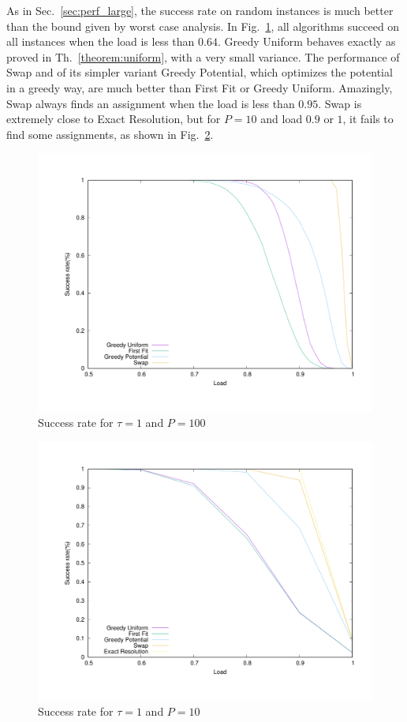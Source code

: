 \documentclass[a4paper,UKenglish,cleveref, autoref, thm-restate]{lipics-v2019}
\begin{document}
As in Sec.~\ref{sec:perf_large}, the success rate on random instances is much better than the bound given by worst case analysis. In Fig.~\ref{fig:tau1}, all algorithms succeed on all instances when the load is less than $0.64$. Greedy Uniform behaves exactly as proved in Th.~\ref{theorem:uniform}, with a very small variance. The performance of Swap and of its simpler variant Greedy Potential, which optimizes the potential in a greedy way, are much better than First Fit or Greedy Uniform. Amazingly, Swap always finds an assignment when the load is less than $0.95$. Swap is extremely close to Exact Resolution, but for $P=10$ and load $0.9$ or $1$, it fails to find some assignments, as shown in Fig.~\ref{fig:tau1-10mess}.

\begin{figure}
\begin{center}
\includegraphics[scale=0.3]{success_tau1}
\end{center}
\caption{Success rate for $\tau = 1$ and $P=100$}
\label{fig:tau1}
\end{figure}

\begin{figure}
\begin{center}
\includegraphics[scale=0.3]{tau110}
\end{center}
\caption{Success rate for $\tau = 1$ and $P=10$}
\label{fig:tau1-10mess}
\end{figure}
 
\end{document}
